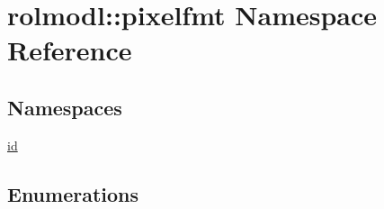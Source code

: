 \hypertarget{namespacerolmodl_1_1pixelfmt}{}\section{rolmodl\+::pixelfmt Namespace Reference}
\label{namespacerolmodl_1_1pixelfmt}
\subsection*{Namespaces}
\begin{DoxyCompactItemize}
\item 
 \mbox{\hyperlink{namespacerolmodl_1_1pixelfmt_1_1id}{id}}
\end{DoxyCompactItemize}
\subsection*{Enumerations}

